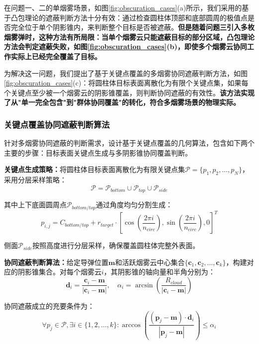 \documentclass[fontset=SimSun]{ctexart}
\begin{document}
在问题一、二的单烟雾场景，如图\ref{fig:obscuration_cases}(a)所示，我们采用的基于凸包理论的遮蔽判断方法十分有效：通过检查圆柱体顶部和底部圆周的极值点是否完全位于单个阴影锥内，来判断整个目标是否被遮蔽。\textbf{但是随着问题三引入多枚烟雾弹时，这种方法有所局限：当单个烟雾云只能遮蔽目标的部分区域，凸包理论方法会判定遮蔽失败，如图\ref{fig:obscuration_cases}(b)，即使多个烟雾云协同工作实际上已经完全覆盖了目标。}

为解决这一问题，我们提出了基于关键点覆盖的多烟雾协同遮蔽判断方法，如图\ref{fig:obscuration_cases}(c)：将圆柱体目标表面离散化为有限个关键点集，如果每个关键点至少被一个烟雾云的阴影锥覆盖，则判断协同遮蔽的有效性。\textbf{该方法实现了从"单一完全包含"到"群体协同覆盖"的转化，符合多烟雾场景的物理实际。}

\subsubsection{关键点覆盖协同遮蔽判断算法}

针对多烟雾协同遮蔽的判断需求，设计基于关键点覆盖的几何算法，包含如下两个主要的步骤：目标表面关键点生成与多阴影锥协同覆盖判断。

\textbf{关键点生成策略：}将圆柱体目标表面离散化为有限关键点集$\mathcal{P} = \{p_1, p_2, \ldots, p_N\}$，采用分层采样策略：
\begin{equation}
\mathcal{P} = \mathcal{P}_{bottom} \cup \mathcal{P}_{top} \cup \mathcal{P}_{side}
\end{equation}

其中上下底面圆周点$\mathcal{P}_{bottom/top}$通过角度均匀分割生成：
\begin{equation}
p_{i,j} = C_{bottom/top} + r_{target} \cdot [\cos(\frac{2\pi i}{n_{circ}}), \sin(\frac{2\pi i}{n_{circ}}), 0]^T
\end{equation}

侧面$\mathcal{P}_{side}$按照高度进行分层采样，确保覆盖圆柱体完整外表面。

\textbf{协同遮蔽判断算法：}给定导弹位置$\mathbf{m}$和活跃烟雾云中心集合$\{\mathbf{c}_1, \mathbf{c}_2, \ldots, \mathbf{c}_k\}$，构建对应的阴影锥集合。对每个烟雾云$i$，其阴影锥的轴向量和半角分别为：
\begin{equation}
\mathbf{d}_i = \frac{\mathbf{c}_i - \mathbf{m}}{|\mathbf{c}_i - \mathbf{m}|}, \quad \alpha_i = \arcsin\left(\frac{R_{cloud}}{|\mathbf{c}_i - \mathbf{m}|}\right)
\end{equation}

协同遮蔽成立的充要条件为：
\begin{equation}
\forall p_j \in \mathcal{P}, \exists i \in \{1,2,\ldots,k\}: \arccos\left(\frac{(\mathbf{p}_j - \mathbf{m}) \cdot \mathbf{d}_i}{|\mathbf{p}_j - \mathbf{m}|}\right) \leq \alpha_i
\end{equation}
\end{document}
